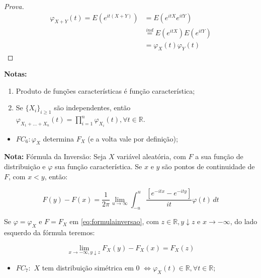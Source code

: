 \documentclass[
]{article}
\providecommand{\tightlist}{%
  \setlength{\itemsep}{0pt}\setlength{\parskip}{0pt}}
\theoremstyle{definition}
\theoremstyle{definition}
\theoremstyle{definition}
\theoremstyle{definition}
\theoremstyle{remark}
\begin{document}
\begin{proof}[Prova]
\begin{align*}
\varphi_{X+Y}(t) = E(e^{it(X + Y)}) &= E(e^{itX}e^{itY}) \\
&\stackrel{ind}{=}E(e^{itX})E(e^{itY}) \\
&= \varphi_{X}(t)\varphi_{Y}(t)
\end{align*}
\end{proof}

\textbf{Notas:}

\begin{enumerate}
\def\labelenumi{\alph{enumi})}
\item
  Produto de funções características é função característica;
\item
  Se \(\{X_{i}\}_{i \ge 1}\) são independentes, então \(\varphi_{X_{1} + \ldots + X_{n}}(t) = \prod_{i=1}^{n}\varphi_{X_{i}}(t), \forall t \in \mathbb{R}\).
\end{enumerate}

\begin{itemize}
\tightlist
\item
  \(FC_{6}: \varphi_{X}\) determina \(F_{X}\) (e a volta vale por definição);
\end{itemize}

\textbf{Nota:} Fórmula da Inversão: Seja \(X\) variável aleatória, com \(F\) a sua função de distribuição e \(\varphi\) sua função característica. Se \(x\) e \(y\) são pontos de continuidade de \(F\), com \(x < y\), então:

\begin{equation}
F(y) - F(x) = \frac{1}{2\pi}\lim_{u \to \infty}\int_{-u}^{u}\frac{[e^{-itx} - e^{-ity}]}{it}\varphi(t)\, dt
\label{eq:formulainversao}
\end{equation}

Se \(\varphi = \varphi_{X}\) e \(F = F_{X}\) em \eqref{eq:formulainversao}, com \(z \in \mathbb{R}, y \downarrow z\) e \(x \to -\infty\), do lado esquerdo da fórmula teremos:

\begin{equation*}
\lim_{x \to -\infty, y \downarrow z}F_{X}(y) - F_{X}(x) = F_{X}(z)
\end{equation*}

\begin{itemize}
\tightlist
\item
  \(FC_{7}:\) \(X\) tem distribuição simétrica em 0 \(\Leftrightarrow \varphi_{X}(t) \in \mathbb{R}, \forall t \in \mathbb{R}\);
\end{itemize}
\end{document}
